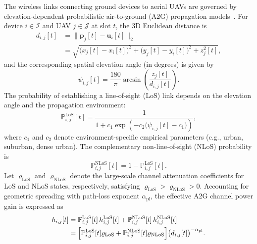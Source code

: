\documentclass[journal]{IEEEtran}
\begin{document}
The wireless links connecting ground devices to aerial UAVs are governed by elevation-dependent probabilistic air-to-ground (A2G) propagation models~\cite{11500527, li2026tnse}. For device $i \in \mathcal{I}$ and UAV $j \in \mathcal{J}$ at slot $t$, the 3D Euclidean distance is
\begin{equation}
\begin{split}
    d_{i,j}[t] &= \|\mathbf{p}_j[t] - \mathbf{u}_i[t]\|_2 \\
    &= \sqrt{\bigl(x_j[t] - x_i[t]\bigr)^2 + \bigl(y_j[t] - y_i[t]\bigr)^2 + z_j^2[t]},
\end{split}
\label{eq:dist_wd_uav}
\end{equation}
and the corresponding spatial elevation angle (in degrees) is given by
\begin{equation}
    \psi_{i,j}[t] = \frac{180}{\pi} \arcsin\!\left(\frac{z_j[t]}{d_{i,j}[t]}\right).
    \label{eq:elev_angle}
\end{equation}
The probability of establishing a line-of-sight (LoS) link depends on the elevation angle and the propagation environment:
\begin{equation}
    \mathbb{P}^{\mathrm{LoS}}_{i,j}[t] = \frac{1}{1 + c_1 \exp\!\left(-c_2\bigl(\psi_{i,j}[t] - c_1\bigr)\right)},
    \label{eq:los_prob}
\end{equation}
where $c_1$ and $c_2$ denote environment-specific empirical parameters (e.g., urban, suburban, dense urban). The complementary non-line-of-sight (NLoS) probability is
\begin{equation}
    \mathbb{P}^{\mathrm{NLoS}}_{i,j}[t] = 1 - \mathbb{P}^{\mathrm{LoS}}_{i,j}[t].
\end{equation}
Let $\varrho_{\mathrm{LoS}}$ and $\varrho_{\mathrm{NLoS}}$ denote the large-scale channel attenuation coefficients for LoS and NLoS states, respectively, satisfying $\varrho_{\mathrm{LoS}} > \varrho_{\mathrm{NLoS}} > 0$. Accounting for geometric spreading with path-loss exponent $\alpha_{\mathrm{pl}}$, the effective A2G channel power gain is expressed as
\begin{equation}
\begin{split}
    h_{i,j}[t] &= \mathbb{P}^{\mathrm{LoS}}_{i,j}[t]\, h_{i,j}^{\mathrm{LoS}}[t] + \mathbb{P}^{\mathrm{NLoS}}_{i,j}[t]\, h_{i,j}^{\mathrm{NLoS}}[t] \\
    &= \Bigl[\mathbb{P}^{\mathrm{LoS}}_{i,j}[t] \varrho_{\mathrm{LoS}} + \mathbb{P}^{\mathrm{NLoS}}_{i,j}[t] \varrho_{\mathrm{NLoS}}\Bigr] \bigl(d_{i,j}[t]\bigr)^{-\alpha_{\mathrm{pl}}}.
\end{split}
\label{eq:channel_gain_a2g}
\end{equation}
\end{document}
